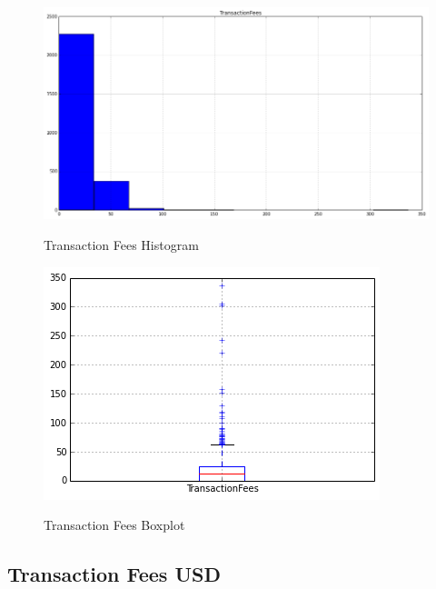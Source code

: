 \begin{figure}[bth]
  \myfloatalign
  {\includegraphics[width=1\linewidth]
    {gfx/transaction-fees-histogram}}
  \caption{Transaction Fees
    Histogram}
  \label{fig:transaction-fees-histogram}
\end{figure}

\begin{figure}[bth]
  \myfloatalign
  {\includegraphics[width=1\linewidth]
    {gfx/transaction-fees-boxplot}}
  \caption{Transaction Fees
    Boxplot}
  \label{fig:transaction-fees-boxplot}
\end{figure}

\clearpage

\subsection{Transaction Fees USD}
\label{sec:transaction-fees-usd}

